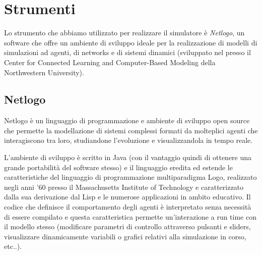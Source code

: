 \section{Strumenti}

Lo strumento che abbiamo utilizzato per realizzare il simulatore  è \emph{Netlogo}, un software che offre un ambiente di sviluppo ideale per la realizzazione di modelli di simulazioni ad agenti, di networks e di sistemi dinamici (sviluppato nel presso il Center for Connected Learning and Computer-Based Modeling della Northwestern University).


\subsection{Netlogo}

Netlogo è un linguaggio di programmazione e ambiente di sviluppo open source che permette la modellazione di sistemi complessi formati da molteplici agenti che interagiscono tra loro, studiandone l'evoluzione  e visualizzandola in tempo reale.

L'ambiente di sviluppo è scritto in Java (con il vantaggio quindi di ottenere una grande portabilità del software stesso) e il linguaggio eredita ed estende le caratteristiche del linguaggio di programmazione multiparadigma Logo, realizzato negli anni '60 presso il Massachusetts Institute of Technology e caratterizzato dalla sua derivazione dal Lisp e le numerose applicazioni in ambito educativo. Il codice che definisce il comportamento degli agenti è interpretato senza necessità di essere compilato e questa caratteristica permette un'interazione a run time con il modello stesso (modificare parametri di controllo attraverso pulsanti e sliders, visualizzare dinamicamente variabili o grafici relativi alla simulazione in corso, etc..).


